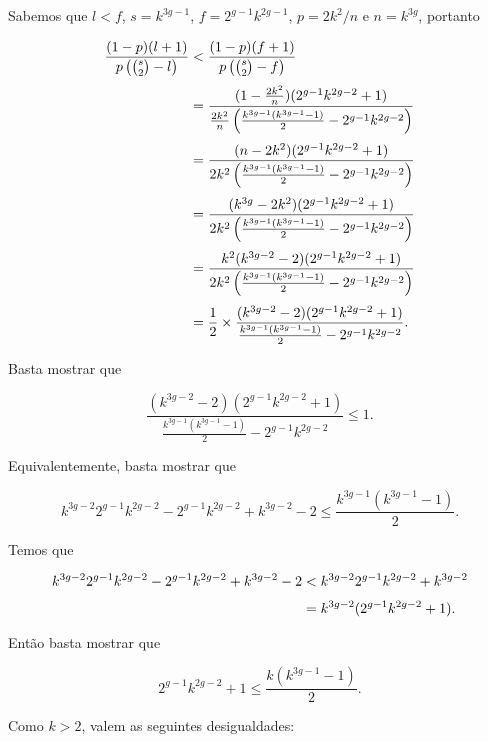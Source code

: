 Sabemos que $l < f$, $s = k^{3g-1}$, $f = 2^{g-1}k^{2g-1}$, $p = 2k^2/n$ e $n = k^{3g}$, portanto

\begin{equation*}
\setlength{\jot}{6pt}
\begin{aligned}
\frac{(1-p)(l+1)}{p\left(\binom{s}{2}-l\right)} &< \frac{(1-p)(f+1)}{p\left(\binom{s}{2}-f\right)} \\
&= \frac{(1-\frac{2k^2}{n})(2^{g-1}k^{2g-2}+1)}{\frac{2k^2}{n}\left(\frac{k^{3g-1}(k^{3g-1}-1)}{2}-2^{g-1}k^{2g-2}\right)} \\
&= \frac{(n-2k^2)(2^{g-1}k^{2g-2}+1)}{2k^2\left(\frac{k^{3g-1}(k^{3g-1}-1)}{2}-2^{g-1}k^{2g-2}\right)} \\
&= \frac{(k^{3g}-2k^2)(2^{g-1}k^{2g-2}+1)}{2k^2\left(\frac{k^{3g-1}(k^{3g-1}-1)}{2}-2^{g-1}k^{2g-2}\right)} \\
&= \frac{k^2(k^{3g-2}-2)(2^{g-1}k^{2g-2}+1)}{2k^2\left(\frac{k^{3g-1}(k^{3g-1}-1)}{2}-2^{g-1}k^{2g-2}\right)} \\
&= \frac{1}{2} \times \frac{(k^{3g-2}-2)(2^{g-1}k^{2g-2}+1)}{\frac{k^{3g-1}(k^{3g-1}-1)}{2}-2^{g-1}k^{2g-2}}.
\end{aligned}
\end{equation*}

Basta mostrar que 

\[\frac{(k^{3g-2}-2)(2^{g-1}k^{2g-2}+1)}{\frac{k^{3g-1}(k^{3g-1}-1)}{2}-2^{g-1}k^{2g-2}} \leq 1.\]

Equivalentemente, basta mostrar que %


\[k^{3g-2}2^{g-1}k^{2g-2}-2^{g-1}k^{2g-2} + k^{3g-2}-2 \leq \frac{k^{3g-1}(k^{3g-1}-1)}{2}.\]

Temos que

\begin{equation*}
\setlength{\jot}{6pt}
\begin{aligned}
k^{3g-2}2^{g-1}k^{2g-2}-2^{g-1}k^{2g-2} + k^{3g-2}-2 &< k^{3g-2}2^{g-1}k^{2g-2} + k^{3g-2} \\
&= k^{3g-2}(2^{g-1}k^{2g-2}+1).
\end{aligned}
\end{equation*}

Então basta mostrar que

\[2^{g-1}k^{2g-2}+1 \leq \frac{k(k^{3g-1}-1)}{2}.\]

Como $k>2$, valem as seguintes desigualdades:

